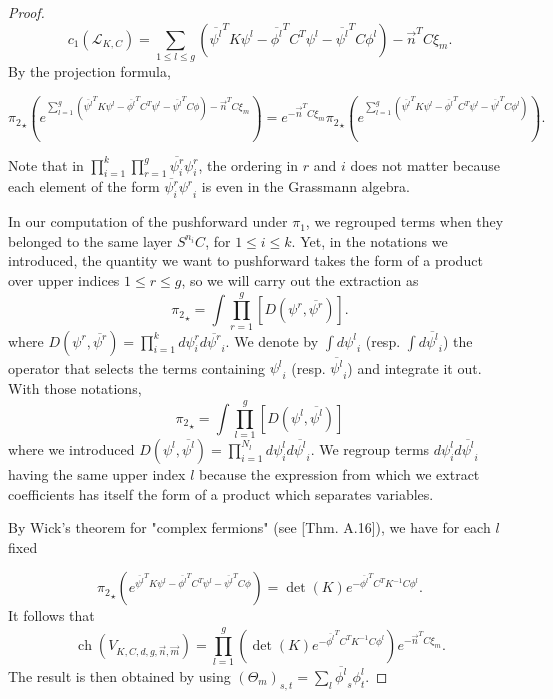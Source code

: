 \documentclass{article}
\theoremstyle{definition}
\DeclareMathOperator{\ch}{ch}
\newcommand{\ov}[1]{\overline{#1}}
\renewcommand{\leq}{\leqslant}
\begin{document}
\begin{proof}
$$c_1(\mathcal{L}_{K,C})=\sum_{1\leq l \leq g} \left( \ov{\psi^l}^T K \psi^l - \ov{\phi^l}^T C^T \psi^l - \ov{\psi^l}^T C \phi^l \right) - \vec{n}^T C \xi_m.$$ By the projection formula, 

$${\pi_2}_\star \left( e^{\sum_{l=1}^g \left( \ov{\psi^l}^T K \psi^l - \ov{\phi^l}^T C^T \psi^l - \ov{\psi^l}^T C \phi \right) - \vec{n}^T C \xi_m}\right)=e^{- \vec{n}^T C \xi_m} {\pi_2}_\star \left( e^{\sum_{l=1}^g \left( \ov{\psi^l}^T K \psi^l - \ov{\phi^l}^T C^T \psi^l - \ov{\psi^l}^T C \phi^l \right) } \right).$$




Note that in $\prod_{i=1}^{k} \prod_{r=1}^g \ov{\psi^r_i} \psi^r_i $, the ordering in $r$ and $i$ does not matter because each element of the form $\ov{\psi^r_i} {\psi^r}_i$ is even in the Grassmann algebra.

In our computation of the pushforward under $\pi_1$, we regrouped terms when they belonged to the same layer $S^{n_i} C$, for $1\leq i \leq k$. 
Yet, in the notations we introduced, the quantity we want to pushforward takes the form of a product over upper indices $1\leq r \leq g$, so we will carry out the extraction as 
$${\pi_2}_\star= \int \prod_{r=1}^g \left[ D(\psi^r,\ov{\psi^r}) \right].$$ 
where $D(\psi^r,\ov{\psi^r})= \prod_{i=1}^k d\psi^r_i d\ov{\psi^r}_i$.
We denote by $\int d {\psi^l}_{i}$ (resp. $\int d \ov{\psi^l}_i$) the operator that selects the terms containing ${\psi^l}_{i}$ (resp. $\ov{\psi^l}_i$) and integrate it out. With those notations, $${\pi_2}_\star= \int \prod_{l=1}^g \left[ D(\psi^l,\ov{\psi^l}) \right]$$ where we introduced $D(\psi^l,\ov{\psi^l})= \prod_{i=1}^{N_l} d\psi^l_i d\ov{\psi^l}_i$. We regroup terms $d\psi^l_i d\ov{\psi^l}_i$ having the same upper index $l$ because the expression from which we extract coefficients has itself the form of a product which separates variables.


By Wick’s theorem for "complex fermions" (see \cite{Caracciolo_Sokal_Sportiello_2013}[Thm. A.16]), we have for each $l$ fixed 


$${\pi_2}_\star\left( e^{ \ov{\psi^l}^T K \psi^l - \ov{\phi^l}^T C^T \psi^l - \ov{\psi^l}^T C \phi }\right)= \det(K) e^{-\ov{\phi^l}^T C^T K^{-1} C \phi^l}.$$ It follows that
$$\ch(V_{K,C,d,g,\vec{n},\vec{m}})=\prod_{l=1}^g \left( \det(K) e^{-\ov{\phi^l}^T C^T K^{-1} C \phi^l} \right) e^{- \vec{n}^T C \xi_m}.$$
The result is then obtained by using $(\Theta_m)_{s,t}=\sum_l {\ov{\phi^l}_s} {\phi^l_t}$.

\end{proof}





\printbibliography
\end{document}
